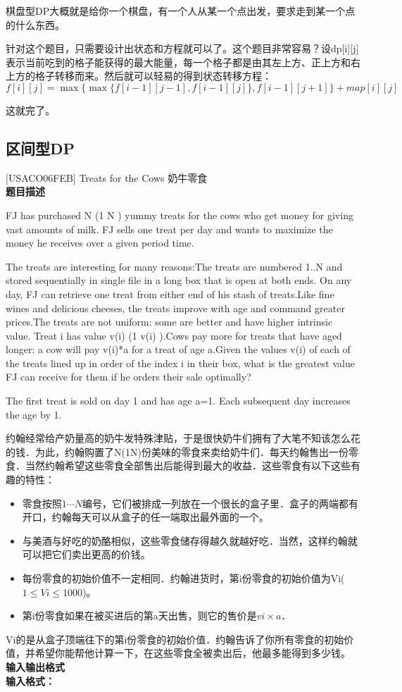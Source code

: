 棋盘型DP大概就是给你一个棋盘，有一个人从某一个点出发，要求走到某一个点的什么东西。

针对这个题目，只需要设计出状态和方程就可以了。这个题目非常容易？设dp[i][j]表示当前吃到的格子能获得的最大能量，每一个格子都是由其左上方、正上方和右上方的格子转移而来。然后就可以轻易的得到状态转移方程：
\begin{equation*}f[i][j] = \max\{\max\{f[i-1][j-1],f[i-1][j]\},f[i-1][j+1]\} + map[i][j]\end{equation*}

这就完了。
\subsection{区间型DP}
\begin{example}{[USACO06FEB] Treats for the Cows 奶牛零食}\\
	\textbf{题目描述}

	FJ has purchased N (1 \leq N ) yummy treats for the cows who get money for giving vast amounts of milk. FJ sells one treat per day and wants to maximize the money he receives over a given period time.

	The treats are interesting for many reasons:The treats are numbered 1..N and stored sequentially in single file in a long box that is open at both ends. On any day, FJ can retrieve one treat from either end of his stash of treats.Like fine wines and delicious cheeses, the treats improve with age and command greater prices.The treats are not uniform: some are better and have higher intrinsic value. Treat i has value v(i) (1 \leq v(i) ).Cows pay more for treats that have aged longer: a cow will pay v(i)*a for a treat of age a.Given the values v(i) of each of the treats lined up in order of the index i in their box, what is the greatest value FJ can receive for them if he orders their sale optimally?

	The first treat is sold on day 1 and has age a=1. Each subsequent day increases the age by 1.

	约翰经常给产奶量高的奶牛发特殊津贴，于是很快奶牛们拥有了大笔不知该怎么花的钱．为此，约翰购置了N(1\leq N)份美味的零食来卖给奶牛们．每天约翰售出一份零食．当然约翰希望这些零食全部售出后能得到最大的收益．这些零食有以下这些有趣的特性：

	\begin{itemize}
		\item{零食按照$1\cdots N$编号，它们被排成一列放在一个很长的盒子里．盒子的两端都有开口，约翰每天可以从盒子的任一端取出最外面的一个。}
		\item{与美酒与好吃的奶酪相似，这些零食储存得越久就越好吃．当然，这样约翰就可以把它们卖出更高的价钱。}
		\item{每份零食的初始价值不一定相同．约翰进货时，第i份零食的初始价值为Vi($1\leq Vi\leq 1000$)。}
		\item{第i份零食如果在被买进后的第a天出售，则它的售价是$vi\times a$．}
	\end{itemize}
	Vi的是从盒子顶端往下的第i份零食的初始价值．约翰告诉了你所有零食的初始价值，并希望你能帮他计算一下，在这些零食全被卖出后，他最多能得到多少钱。\ \\
	\textbf{输入输出格式}\\
	\textbf{输入格式：}


\end{example}
